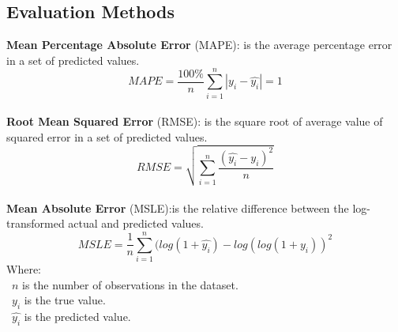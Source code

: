 \documentclass{ieeeojies}
\begin{document}
\subsection{Evaluation Methods}
\textbf{Mean Percentage Absolute Error} (MAPE): is the average percentage error in a set of predicted values.\\
\[MAPE=\frac{100\%}{n}  \sum_{i=1}^{n} |y_i-\hat{y_i} |  = 1 \]\\
\textbf{Root Mean Squared Error} (RMSE): is the square root of average value of squared error in a set of predicted values.\\
\[RMSE=\sqrt{\sum_{i=1}^{n} \frac{(\hat{y_i}-y_i )^2}{n} }\]\\
\textbf{Mean Absolute Error} (MSLE):is the relative difference between the log-transformed actual and predicted values.\\
\[MSLE=\frac{1}{n}\sum_{i=1}^{n}(log(1+\hat{y_i})-log(log(1+y_i))^2\]
Where: \\
	\indent\textbullet\ \(n\) is the number of observations in the dataset.\\
	\indent\textbullet\ \(y_i\)  is the true value.\\
	\indent\textbullet\ \(\hat{y_i}\) is the predicted value.
\end{document}
